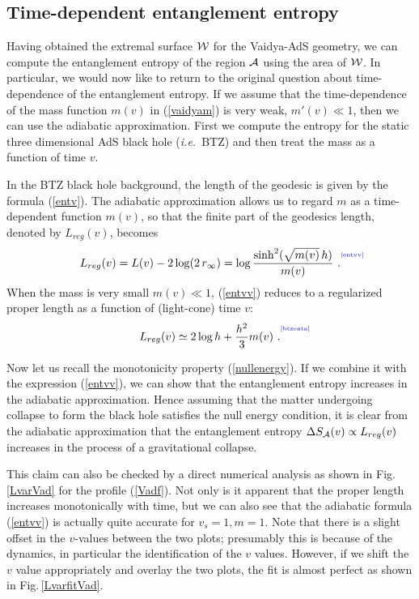 \documentclass[12pt]{article}
\newcommand{\be}{\begin{equation}}
\newcommand{\ee}{\end{equation}}
\def\fig#1{Fig.\,\ref{#1}}
\def\req#1{(\ref{#1})}
\def\ie{{\it i.e.}}
\def\D{\Delta}
\def\s{\sigma}
\def\CA{{\cal A}}
\def\CW{{\cal W}}
\def\f#1#2{{\frac{#1}{#2}}}
\def\f#1#2{{\frac{#1}{#2}}}
\def\Label#1{\label{#1}%
{ \color{blue}{\smash{\hbox to0pt{\raise2ex\hbox{\tiny[#1]}\hss}}}}}
\def\Gms{\CW}
\def\rA{\CA}
\def\s{\sqrt}
\def\f {\frac}
\begin{document}
\subsection{Time-dependent entanglement entropy}

Having obtained the extremal surface $\Gms$ for the Vaidya-AdS geometry, we can compute the entanglement entropy of the region $\rA$ using the area of $\Gms$.
In particular, we would now like to return to the original question about
time-dependence of the entanglement entropy. If we assume that the
time-dependence of the mass function $m(v)$ in \req{vaidyam} is very weak, $m'(v) \ll  1$, then we can use the adiabatic approximation. First we compute the
entropy for the static three dimensional AdS black hole (\ie\ BTZ) and
then treat the mass as a function of time $v$.

In the BTZ black hole background, the length of the geodesic is
given by the formula \req{entv}. The adiabatic approximation allows
us to regard $m$ as a time-dependent function $m(v)$, so that the
finite part of the geodesics length, denoted by $L_{reg}(v)$,
becomes
%
\be
L_{reg}(v) = L(v)-2\log(2\,r_{\infty})=\log\f{\sinh^2(\s{m(v)}\, h)}{m(v)} \ .
\Label{entvv} \ee
%
When the mass is very small $m(v)\ll 1$, \req{entvv} reduces to a regularized proper length as a function of (light-cone) time $v$:
%
\be L_{reg}(v)\simeq 2\log
h+\f{h^2}{3}m(v) \ . \Label{btzenta} \ee
%

Now let us recall the monotonicity property \req{nullenergy}. If
we combine it with the expression \req{entvv}, we can show that the
entanglement entropy increases in the adiabatic approximation. Hence assuming that the matter undergoing collapse to form the black hole satisfies the null energy condition, it is clear from the adiabatic approximation that the entanglement entropy
$\D S_\rA(v) \propto L_{reg}(v)$ increases in the process of a gravitational collapse.

This claim can also be checked by a direct numerical analysis as
shown in \fig{LvarVad} for the profile \req{Vadf}. Not
only is it apparent that the proper length increases monotonically with time,
but we can also see that the adiabatic formula (\ref{entvv}) is actually quite
accurate for $v_s=1, m=1$. Note that there is a slight offset in the
$v$-values between the two plots; presumably this is because of the
dynamics, in particular the identification of the $v$ values.
However, if we shift the $v$ value appropriately and overlay the two
plots, the fit is almost perfect as shown in \fig{LvarfitVad}.
\end{document}
